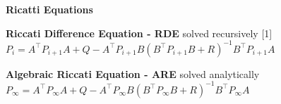 
\begin{sstTitleBox}[ForestGreen]{\center\textbf{\large
			Ricatti Equations
		}
	}


	\begin{sstOnlyFrame}[ForestGreen]
		{\textbf{Riccati Difference Equation - RDE} solved recursively}
		\scalebox{0.97}[1]{$
				\scriptstyle
				P_i = A^\top P_{i+1} A
				+ Q - A^\top P_{i+1} B
				(B^\top P_{i+1} B + R)^{-1}
				B^\top P_{i+1} A$}
	\end{sstOnlyFrame}

	\begin{sstOnlyFrame}[ForestGreen]
		{\textbf{Algebraic Riccati Equation - ARE} solved analytically}
		{\center$\scriptstyle
				P_\infty = A^\top P_\infty A
				+ Q - A^\top P_\infty B
				(B^\top P_\infty B + R)^{-1}
				B^\top P_\infty A$}
	\end{sstOnlyFrame}

\end{sstTitleBox}
